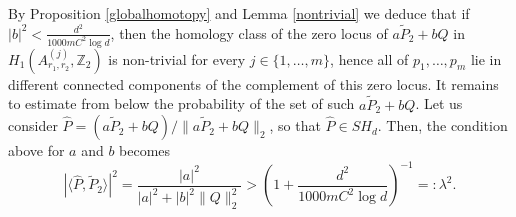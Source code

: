 \documentclass [11pt]{amsart}
\theoremstyle{remark}
\numberwithin{equation}{section}
\numberwithin{theorem}{section}
\begin{document}
\noindent By Proposition \ref{globalhomotopy} and Lemma \ref{nontrivial} we deduce that if $\displaystyle{|b|^2< \frac{d^2}{1000m C^2 \log d}}$, then the homology class of the zero locus of $a\widetilde{P}_{2}+bQ$ in $H_{1}(A^{(j)}_{r_{1},r_{2}},\mathbb{Z}_{2})$ is non-trivial for every $j\in \{1,\ldots,m\}$, hence all of $p_{1},\ldots,p_{m}$ lie in different connected components of the complement of this zero locus. It remains to estimate from below the probability of the set of such $a\widetilde{P}_{2}+bQ$. Let us consider $\widehat{P}=(a\widetilde{P}_{2}+bQ)/\|a\widetilde{P}_{2}+bQ\|_{2}$, so that $\widehat{P}\in SH_{d}$. Then, the condition above for $a$ and $b$ becomes 
\[ |\langle\widehat{P},\widetilde{P}_{2}\rangle|^2=\frac{|a|^2}{|a|^2+|b|^2\|Q\|_{2}^2} >  \left(1+\frac{d^2}{1000m C^2 \log d}\right)^{-1}=:\lambda^2. \]
\end{document}
